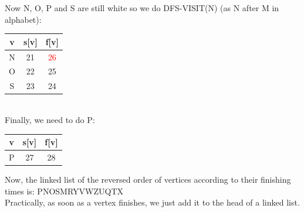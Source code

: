 \documentclass[11pt]{article}
\begin{document}
\begin{enumerate}
\begin{center}
    \end{center}
    Now N, O, P and S are still white so we do DFS-VISIT(N) (as N after M in alphabet):
    \begin{center}
        \begin{tabular}{|c | c | c |} 
        \hline
        v & s[v] & f[v] \\ [0.5ex] 
        \hline\hline
        N & 21 & \textcolor{red}{26} \\
        \hline
        O & 22 & 25 \\
        \hline
        S & 23 & 24 \\ [1ex] 
        \hline
        \end{tabular}
    \end{center}
    \\ Finally, we need to do P:
    \begin{center}
        \begin{tabular}{|c | c | c |} 
        \hline
        v & s[v] & f[v] \\ [0.5ex] 
        \hline\hline
        P & 27 & 28 \\ [1ex]
        \hline
        \end{tabular}
    \end{center}
    Now, the linked list of the reversed order of vertices according to their finishing times is: PNOSMRYVWZUQTX
    \\ Practically, as soon as a vertex finishes, we just add it to the head of a linked list.
    

\end{enumerate}
\end{document}
